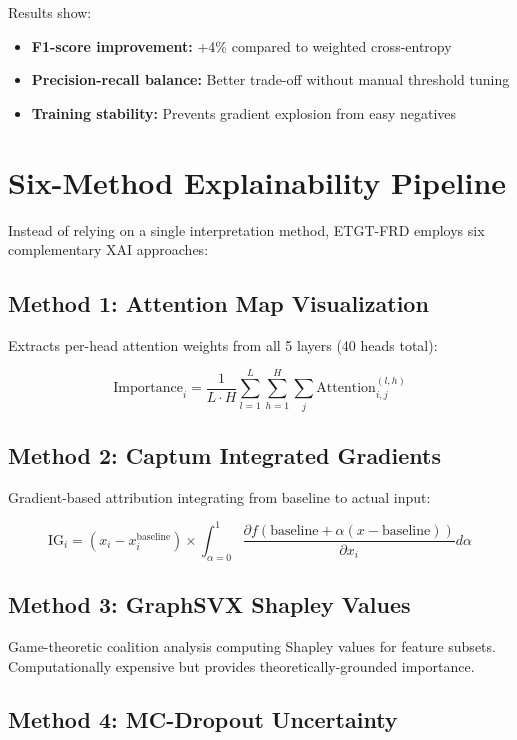 \documentclass[10pt,conference,compsociety]{IEEEtran}
\begin{document}
Results show:
\begin{itemize}
    \item \textbf{F1-score improvement:} +4\% compared to weighted cross-entropy
    \item \textbf{Precision-recall balance:} Better trade-off without manual threshold tuning
    \item \textbf{Training stability:} Prevents gradient explosion from easy negatives
\end{itemize}

\section{Six-Method Explainability Pipeline}

Instead of relying on a single interpretation method, ETGT-FRD employs six complementary XAI approaches:

\subsection{Method 1: Attention Map Visualization}

Extracts per-head attention weights from all 5 layers (40 heads total):

\[
\text{Importance}_i = \frac{1}{L \cdot H} \sum_{l=1}^{L} \sum_{h=1}^{H} \sum_{j} \text{Attention}_{i,j}^{(l,h)}
\]

\subsection{Method 2: Captum Integrated Gradients}

Gradient-based attribution integrating from baseline to actual input:

\[
\text{IG}_i = (x_i - x_i^{\text{baseline}}) \times \int_{\alpha=0}^{1} \frac{\partial f(\text{baseline} + \alpha(x - \text{baseline}))}{\partial x_i} d\alpha
\]

\subsection{Method 3: GraphSVX Shapley Values}

Game-theoretic coalition analysis computing Shapley values for feature subsets. Computationally expensive but provides theoretically-grounded importance.

\subsection{Method 4: MC-Dropout Uncertainty}
\end{document}
